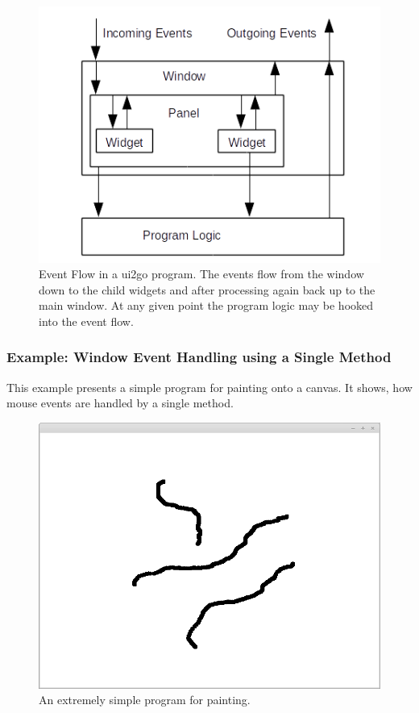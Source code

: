 \begin{figure}[ht]
\centering
\includegraphics[width=12cm]{img/eventflow.png}
\caption{Event Flow in a ui2go program. The events flow from
the window down to the child widgets and after processing
again back up to the main window. At any given point the
program logic may be hooked into the event flow.}
\end{figure}

\pagebreak

\subsubsection*{Example: Window Event Handling using a Single Method}

This example presents a simple program for painting onto a canvas. It
shows, how mouse events are handled by a single method.

\begin{figure}[ht!]
\centering
\includegraphics[width=12cm]{img/simplepaint.png}
\caption{An extremely simple program for painting.}
\end{figure}

